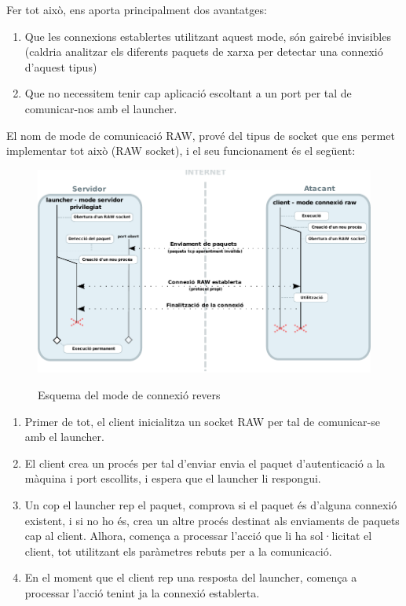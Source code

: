 Fer tot això, ens aporta principalment dos avantatges: \\

\begin{enumerate}
    \item Que les connexions establertes utilitzant aquest mode, són gairebé invisibles (caldria analitzar els
        diferents paquets de xarxa per detectar una connexió d'aquest tipus)
    \item Que no necessitem tenir cap aplicació escoltant a un port per tal de comunicar-nos amb el launcher.
\end{enumerate}

El nom de mode de comunicació RAW, prové del tipus de socket que ens permet implementar tot això (RAW socket),
i el seu funcionament és el següent: \\

\begin{figure}[htp]
    \centering
    \includegraphics[scale=1,keepaspectratio]{diagrames/solutionDesignPrivilegedServerModeRAW.pdf} \\
    \caption{Esquema del mode de connexió revers}
    \label{fig:modePrivilegedServerRAW}
\end{figure}

\begin{enumerate}
    \item Primer de tot, el client inicialitza un socket RAW per tal de comunicar-se amb el launcher.
    \item El client crea un procés per tal d'enviar envia el paquet d'autenticació a la màquina i port escollits,
        i espera que el launcher li respongui.
    \item Un cop el launcher rep el paquet, comprova si el paquet és d'alguna connexió existent, i si no
        ho és, crea un altre procés destinat als enviaments de paquets cap al client. Alhora, comença a
        processar l'acció que li ha sol·licitat el client, tot utilitzant els paràmetres rebuts per a la 
        comunicació.
    \item En el moment que el client rep una resposta del launcher, comença a processar l'acció tenint
        ja la connexió establerta.
\end{enumerate}

